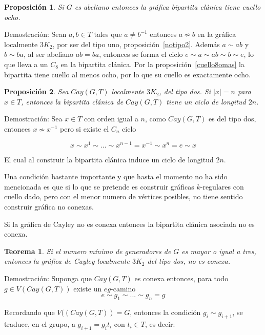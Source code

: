 \documentclass[12pt]{book}
\newtheorem{theorem}{Teorema}
\newtheorem{proposition}{Proposición}
\theoremstyle{definition}
\begin{document}
\begin{proposition}\label{bipcuello8}
  Si $G$ es abeliano entonces la gráfica bipartita clánica tiene
  cuello ocho.
\end{proposition}

Demostración: Sean $a,b\in T$ tales que $a\not=b^{-1}$ entonces
$a\not\sim b$ en la gráfica localmente $3K_2$, por ser del tipo uno,
proposición~\ref{notipo2}.  Además $a\sim ab$ y $b \sim ba$, al ser
abeliano $ab=ba$, entonces se forma el ciclo $e\sim a\sim ab\sim b\sim
e$, lo que lleva a un $C_8$ en la bipartita clánica. Por la
proposición~\ref{cuello8omas} la bipartita tiene cuello al menos ocho,
por lo que su cuello es exactamente ocho.

\begin{proposition}\label{Bciclo2n}
  Sea $Cay(G,T)$ localmente $3K_2$, del tipo dos. Si $|x|=n$ para
  $x\in T$, entonces la bipartita clánica de $Cay(G,T)$ tiene un ciclo
  de longitud $2n$.
\end{proposition}

Demostración: Sea $x\in T$ con orden igual a $n$, como $Cay(G,T)$ es
del tipo dos, entonces $x\nsim x^{-1}$ pero si existe el $C_n$ ciclo

\begin{equation*}
  x\sim x^1\sim ...\sim x^{n-1}=x^{-1} \sim x^{n}=e \sim x
\end{equation*} 

El cual al construir la bipartita clánica induce un ciclo de longitud
$2n$.

Una condición bastante importante y que hasta el momento no ha sido
mencionada es que si lo que se pretende es construir gráficas
$k$-regulares con cuello dado, pero con el menor numero de vértices
posibles, no tiene sentido construir gráfica no conexas.

Si la gráfica de Cayley no es conexa entonces la bipartita clánica
asociada no es conexa.

\begin{theorem}\label{Cayconexa2}
  Si el numero mínimo de generadores de $G$ es mayor o igual a tres,
  entonces la gráfica de Cayley localmente $3K_2$ del tipo dos, no es
  conexa.
\end{theorem}

Demostración: Suponga que $Cay(G,T)$ es conexa entonces, para todo
$g\in V(Cay(G,T))$ existe un $eg$-camino $$e\sim g_1\sim ... \sim g_n
=g$$

Recordando que $V((Cay(G,T))=G$, entonces la condición $g_i\sim
g_{i+1}$, se traduce, en el grupo, a $g_{i+1}=g_{i}t_i$ con $t_i\in
T$, es decir:
\end{document}
